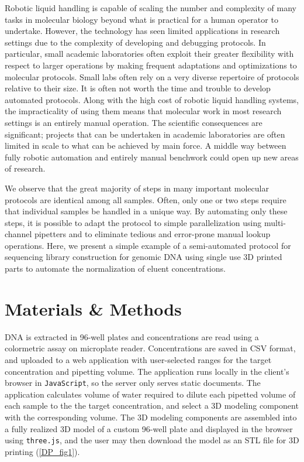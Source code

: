 \begin{refsection}
Robotic liquid handling is capable of scaling the number and complexity of many tasks in molecular biology beyond what is practical for a human operator to undertake. However, the technology has seen limited applications in research settings due to the complexity of developing and debugging protocols. In particular, small academic laboratories often exploit their greater flexibility with respect to larger operations by making frequent adaptations and optimizations to molecular protocols. Small labs often rely on a very diverse repertoire of protocols relative to their size. It is often not worth the time and trouble to develop automated protocols. Along with the high cost of robotic liquid handling systems, the impracticality of using them means that molecular work in most research settings is an entirely manual operation. The scientific consequences are significant; projects that can be undertaken in academic laboratories are often limited in scale to what can be achieved by main force. A middle way between fully robotic automation and entirely manual benchwork could open up new areas of research.

We observe that the great majority of steps in many important molecular protocols are identical among all samples. Often, only one or two steps require that individual samples be handled in a unique way. By automating only these steps, it is possible to adapt the protocol to simple parallelization using multi-channel pipetters and to eliminate tedious and error-prone manual lookup operations. Here, we present a simple example of a semi-automated protocol for sequencing library construction for genomic DNA using single use 3D printed parts to automate the normalization of eluent concentrations.

\section{Materials \& Methods}

DNA is extracted in 96-well plates and concentrations are read using a colormetric assay on microplate reader. Concentrations are saved in CSV format, and uploaded to a web application with user-selected ranges for the target concentration and pipetting volume. The application runs locally in the client's browser in {\tt JavaScript}, so the server only serves static documents. The application calculates volume of water required to dilute each pipetted volume of each sample to the the target concentration, and select a 3D modeling component with the corresponding volume. The 3D modeling components are assembled into a fully realized 3D model of a custom 96-well plate and displayed in the browser using {\tt three.js}, and the user may then download the model as an STL file for 3D printing (\ref{DP_fig1}). 


\end{refsection}
